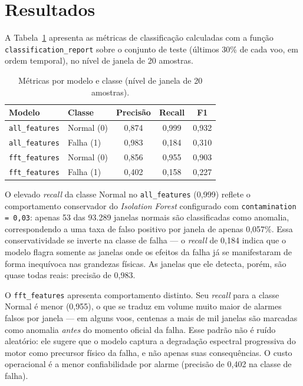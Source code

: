 \documentclass[12pt, a4paper]{article}
\begin{document}
\section{Resultados}

A Tabela~\ref{tab:metricas} apresenta as métricas de classificação calculadas com a função \texttt{classification\_report} sobre o conjunto de teste (últimos 30\% de cada voo, em ordem temporal), no nível de janela de 20 amostras.

\begin{table}[H]
  \centering
  \caption{Métricas por modelo e classe (nível de janela de 20 amostras).}
  \label{tab:metricas}
  \small
  \begin{tabular}{llccc}
    \toprule
    \textbf{Modelo} & \textbf{Classe} & \textbf{Precisão} & \textbf{Recall} & \textbf{F1} \\
    \midrule
    \rowcolor{azulhd}
    \texttt{all\_features} & Normal (0) & 0{,}874 & 0{,}999 & 0{,}932 \\
    \rowcolor{azulhd}
    \texttt{all\_features} & Falha  (1) & 0{,}983 & 0{,}184 & 0{,}310 \\
    \rowcolor{azulhd2}
    \texttt{fft\_features} & Normal (0) & 0{,}856 & 0{,}955 & 0{,}903 \\
    \rowcolor{azulhd2}
    \texttt{fft\_features} & Falha  (1) & 0{,}402 & 0{,}158 & 0{,}227 \\
    \bottomrule
  \end{tabular}
\end{table}

O elevado \textit{recall} da classe Normal no \texttt{all\_features} (0{,}999) reflete o comportamento conservador do \textit{Isolation Forest} configurado com \texttt{contamination\,=\,0{,}03}: apenas 53 das 93.289 janelas normais são classificadas como anomalia, correspondendo a uma taxa de falso positivo por janela de apenas 0{,}057\%. Essa conservatividade se inverte na classe de falha --- o \textit{recall} de 0{,}184 indica que o modelo flagra somente as janelas onde os efeitos da falha já se manifestaram de forma inequívoca nas grandezas físicas. As janelas que ele detecta, porém, são quase todas reais: precisão de 0{,}983.

O \texttt{fft\_features} apresenta comportamento distinto. Seu \textit{recall} para a classe Normal é menor (0{,}955), o que se traduz em volume muito maior de alarmes falsos por janela --- em alguns voos, centenas a mais de mil janelas são marcadas como anomalia \textit{antes} do momento oficial da falha. Esse padrão não é ruído aleatório: ele sugere que o modelo captura a degradação espectral progressiva do motor como precursor físico da falha, e não apenas suas consequências. O custo operacional é a menor confiabilidade por alarme (precisão de 0{,}402 na classe de falha).
\end{document}
